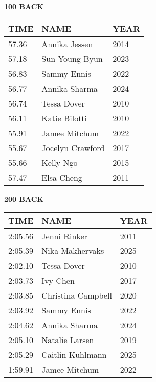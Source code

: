 \begin{minipage}[t]{0.48\textwidth}
\centering
\textbf{100 BACK}\\[0.05cm]
\begin{tabular}{@{}p{1.8cm}p{2.8cm}p{1.2cm}@{}}
\hline
\textbf{TIME} & \textbf{NAME} & \textbf{YEAR} \\
\hline
57.36 & Annika Jessen & 2014 \\
57.18 & Sun Young Byun & 2023 \\
56.83 & Sammy Ennis & 2022 \\
56.77 & Annika Sharma & 2024 \\
56.74 & Tessa Dover & 2010 \\
56.11 & Katie Bilotti & 2010 \\
55.91 & Jamee Mitchum & 2022 \\
55.67 & Jocelyn Crawford & 2017 \\
55.66 & Kelly Ngo & 2015 \\
57.47 & Elsa Cheng & 2011 \\
\hline
\end{tabular}
\end{minipage}\hfill
\begin{minipage}[t]{0.48\textwidth}
\centering
\textbf{200 BACK}\\[0.05cm]
\begin{tabular}{@{}p{1.8cm}p{2.8cm}p{1.2cm}@{}}
\hline
\textbf{TIME} & \textbf{NAME} & \textbf{YEAR} \\
\hline
2:05.56 & Jenni Rinker & 2011 \\
2:05.39 & Nika Makhervaks & 2025 \\
2:02.10 & Tessa Dover & 2010 \\
2:03.73 & Ivy Chen & 2017 \\
2:03.85 & Christina Campbell & 2020 \\
2:03.92 & Sammy Ennis & 2022 \\
2:04.62 & Annika Sharma & 2024 \\
2:05.10 & Natalie Larsen & 2019 \\
2:05.29 & Caitlin Kuhlmann & 2025 \\
1:59.91 & Jamee Mitchum & 2022 \\
\hline
\end{tabular}
\end{minipage}

\vspace{0.4cm}

